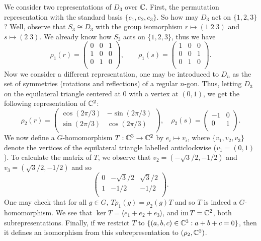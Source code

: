 \begin{example}
  We consider two representations of $D_3$ over $\mathbb{C}$. First, the permutation representation with the standard basis $\{e_1, e_2, e_3\}$. So how may $D_3$ act on $\{1,2,3\}$? Well, observe that $S_3 \cong D_3$ with the group isomorphism $r \mapsto (1\;2\;3)$ and $s \mapsto (2\;3)$. We already know how $S_3$ acts on $\{1,2,3\}$, thus we have
  \[
    \rho_1(r) =
    \begin{pmatrix}
      0 & 0 & 1 \\
      1 & 0 & 0 \\
      0 & 1 & 0 \\
    \end{pmatrix}, \qquad
    \rho_1(s) =
    \begin{pmatrix}
      1 & 0 & 0 \\
      0 & 0 & 1 \\
      0 & 1 & 0 \\
    \end{pmatrix}.
  \]
  Now we consider a different representation, one may be introduced to $D_n$ as the set of symmetries (rotations and reflections) of a regular $n$-gon. Thus, letting $D_3$ on the equilateral triangle centered at $0$ with a vertex at $(0,1)$, we get the following representation of $\mathbb{C}^2$:  \[
    \rho_2(r) =
    \begin{pmatrix}
      \cos(2\pi/3) & -\sin(2\pi/3) \\
      \sin(2\pi/3) & \cos(2\pi/3)  \\
    \end{pmatrix}, \quad
    \rho_2(s) =
    \begin{pmatrix}
      -1 & 0 \\
      0  & 1 \\
    \end{pmatrix}.
  \]
  We now define a $G$-homomorphism $T: \mathbb{C}^3 \to \mathbb{C}^2$ by $e_i \mapsto v_i$, where $\{v_1, v_2, v_3\}$ denote the vertices of the equilateral triangle labelled anticlockwise ($v_1 = (0,1)$). To calculate the matrix of $T$, we observe that $v_2 = (-\sqrt3/2,-1/2)$ and $v_3=(\sqrt3/2,-1/2)$ and so
  \[
    \begin{pmatrix}
      0 & -\sqrt3/2 & \sqrt3/2 \\
      1 & -1/2      & -1/2     \\
    \end{pmatrix}.
  \]
  One may check that for all $g \in G$, $T\rho_1(g) = \rho_2(g)T$ and so $T$ is indeed a $G$-homomorphism. We see that $\ker T = \langle e_1 + e_2 + e_3 \rangle$, and $\operatorname{im} T = \mathbb{C}^2$, both subrepresentations. Finally, if we restrict $T$ to $\{(a,b,c) \in \mathbb{C}^3: a+b+c=0\}$, then it defines an isomorphism from this subrepresentation to $(\rho_2, \mathbb{C}^2)$.
\end{example}

